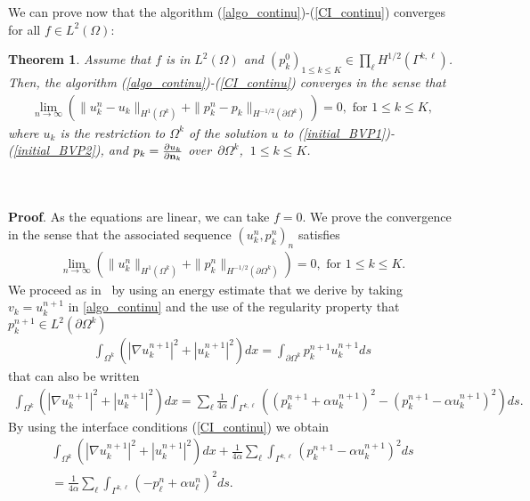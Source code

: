 \documentclass[final]{siamltex}
\newtheorem{theo}{Theorem}
\begin{document}
  We can prove now that the algorithm (\ref{algo_continu})-(\ref{CI_continu})
converges for all $f \in L^2(\Omega)$:
\begin{theo}
Assume that $f$ is in $L^2(\Omega)$ and $(p^0_k)_{1 \le k \le K}
\in \prod_\ell H^{1/2}(\Gamma^{k,\ell})$. Then, the algorithm
(\ref{algo_continu})-(\ref{CI_continu}) converges
in the sense that
\begin{eqnarray}
\lim_{n \longrightarrow \infty} \left( \|u_k^n - u_k\|_{H^1(\Omega^k)}
+  \|p_k^n-p_k\|_{H^{-1/2}(\partial\Omega^k)} \right)=0,
\mbox{  for } 1\le k\le K, \nonumber
\end{eqnarray}
where $u_k$ is the restriction to $\Omega^k$ of the solution $u$
to (\ref{initial_BVP1})-(\ref{initial_BVP2}), and $p_k = {\partial
u_k \over\partial {{\bf n}}_k}$ over~$\partial\Omega^k$, $\ 1 \le k \le K$.
\end{theo}
\\\\
{\bf Proof}.
As the equations are linear,
we can take $f=0$. We prove the convergence in the sense that the
associated sequence $(u_k^n,p_k^n)_n$ satisfies
\begin{eqnarray}
\lim_{n \longrightarrow \infty} \left( \|u_k^n\|_{H^1(\Omega^k)}
+  \|p_k^n\|_{H^{-1/2}(\partial\Omega^k)} \right)=0,
\mbox{  for } 1\le k\le K. \nonumber
\end{eqnarray}
We proceed as in~\cite{Lions,Despres.2} by using an energy estimate that we
derive by taking
$v_k=u_k^{n+1}$ in \eqref{algo_continu} and the use of the regularity
property that
$p_k^{n+1} \in L^2(\partial\Omega^k)$
\begin{eqnarray}
\int_{\Omega^k} \left( |\nabla u_k^{n+1}|^2
+|u_k^{n+1}|^2 \right) dx
=  \int_{\partial\Omega^k} p_k^{n+1}u_k^{n+1} ds \nonumber
\end{eqnarray}
that can also be written
\begin{eqnarray}
\int_{\Omega^k} \left( |\nabla u_k^{n+1}|^2
+|u_k^{n+1}|^2 \right) dx
=\sum_{\ell} \frac{1}{4\alpha} \int_{\Gamma^{k,\ell}}\left(
( p_k^{n+1}+\alpha u_k^{n+1})^2 - ( p_k^{n+1}-\alpha u_k^{n+1})^2\right)ds.
  \nonumber
\end{eqnarray}
By using the interface conditions (\ref{CI_continu}) we obtain
\begin{eqnarray}\label{estim_en}
\int_{\Omega^k} \left( |\nabla u_k^{n+1}|^2
+|u_k^{n+1}|^2 \right) dx
+\frac{1}{4\alpha}\sum_{\ell}\int_{\Gamma^{k,\ell}}
( p_k^{n+1}-\alpha u_k^{n+1})^2ds
\nonumber\\
= \frac{1}{4\alpha}\sum_{\ell}\int_{\Gamma^{k,\ell}}
( - p_{\ell}^{n}+\alpha u_{\ell}^{n})^2ds.
\end{eqnarray}
\end{document}
